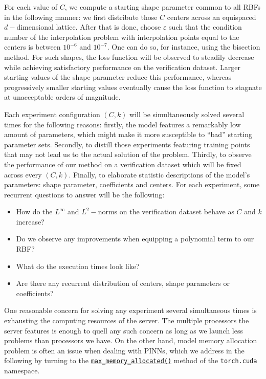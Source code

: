 \documentclass[12pt]{report} %
\begin{document}
For each value of $C$, we compute a starting shape parameter common to all RBFs in the following manner: we first distribute those $C$ centers across an equispaced $d-$dimensional lattice. After that is done, choose $\varepsilon$ such that the condition number of the interpolation problem with interpolation points equal to the centers is between $10^{-6}$ and $10^{-7}$. One can do so, for instance, using the bisection method. For such shapes, the loss function will be observed to steadily decrease while achieving satisfactory performance on the verification dataset. Larger starting values of the shape parameter reduce this performance, whereas progressively smaller starting values eventually cause the loss function to stagnate at unacceptable orders of magnitude.

Each experiment configuration $(C,k)$ will be simultaneously solved several times for the following reasons: firstly, the model features a remarkably low amount of parameters, which might make it more susceptible to ``bad'' starting parameter sets. Secondly, to distill those experiments featuring training points that may not lead us to the actual solution of the problem. Thirdly, to observe the performance of our method on a verification dataset which will be fixed across every $(C,k)$. Finally, to elaborate statistic descriptions of the model's parameters: shape parameter, coefficients and centers. For each experiment, some recurrent questions to answer will be the following:

\begin{itemize}
  \item How do the $L^\infty$ and $L^2-$norms on the verification dataset behave as $C$ and $k$ increase?
  \item Do we observe any improvements when equipping a polynomial term to our RBF?
  \item What do the execution times look like? %
  \item Are there any recurrent distribution of centers, shape parameters or coefficients?
\end{itemize}

One reasonable concern for solving any experiment several simultaneous times is exhausting the computing resources of the server. The multiple processors the server features is enough to quell any such concern as long as we launch less problems than processors we have. On the other hand, model memory allocation problem is often an issue when dealing with PINNs, which we address in the following by turning to the \href{https://pytorch.org/docs/stable/generated/torch.cuda.max_memory_allocated.html}{\texttt{max\_memory\_allocated()}}
method of the \texttt{torch.cuda} namespace. 
\end{document}
